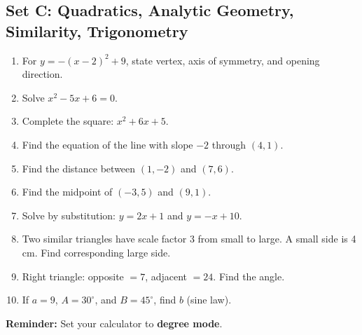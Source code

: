 \documentclass[12pt,oneside]{article}
\newcommand{\ws}[1]{\vspace*{#1}}
\newcommand{\degmode}{\textbf{Reminder:} Set your calculator to \textbf{degree mode}.}
\begin{document}
\subsection{Set C: Quadratics, Analytic Geometry, Similarity, Trigonometry}
\begin{enumerate}
  \item For $y=-(x-2)^2+9$, state vertex, axis of symmetry, and opening direction. \ws{2.0cm}
  \item Solve $x^2-5x+6=0$. \ws{1.6cm}
  \item Complete the square: $x^2+6x+5$. \ws{1.7cm}
  \item Find the equation of the line with slope $-2$ through $(4,1)$. \ws{1.8cm}
  \item Find the distance between $(1,-2)$ and $(7,6)$. \ws{1.8cm}
  \item Find the midpoint of $(-3,5)$ and $(9,1)$. \ws{1.6cm}
  \item Solve by substitution: $y=2x+1$ and $y=-x+10$. \ws{1.8cm}
  \item Two similar triangles have scale factor 3 from small to large. A small side is 4 cm. Find corresponding large side. \ws{1.7cm}
  \item Right triangle: opposite $=7$, adjacent $=24$. Find the angle. \ws{1.7cm}
  \item If $a=9$, $A=30^\circ$, and $B=45^\circ$, find $b$ (sine law). \ws{2.0cm}
\end{enumerate}
\degmode
\end{document}
